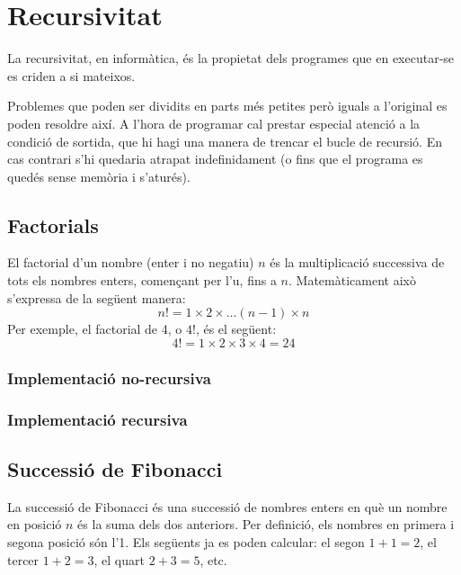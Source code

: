 \chapter{Recursivitat}

La recursivitat, en informàtica, és la propietat dels programes que en executar-se es criden a si mateixos.

Problemes que poden ser dividits en parts més petites però iguals a l'original es poden resoldre així.
A l'hora de programar cal prestar especial atenció a la condició de sortida, que hi hagi una manera de trencar el bucle de recursió. En cas contrari s'hi quedaria atrapat indefinidament (o fins que el programa es quedés sense memòria i s'aturés).

\section{Factorials}
El factorial d'un nombre (enter i no negatiu) $n$ és la multiplicació successiva de tots els nombres enters, començant per l'u, fins a $n$.
Matemàticament això s'expressa de la següent manera:
\begin{equation*}
	n! = 1 \times 2 \times \ldots (n-1) \times n 
\end{equation*}
Per exemple, el factorial de 4, o $4!$, és el següent:
\begin{equation*}
	4! = 1 \times 2 \times 3 \times 4 = 24 
\end{equation*}

\subsection{Implementació no-recursiva}


\subsection{Implementació recursiva}


\section{Successió de Fibonacci}
La successió de Fibonacci és una successió de nombres enters en què un nombre en posició $n$ és la suma dels dos anteriors.
Per definició, els nombres en primera i segona posició són l'1. Els següents ja es poden calcular: el segon $1 + 1 = 2$, el tercer $1 + 2 = 3$, el quart $2 + 3 = 5$, etc.

